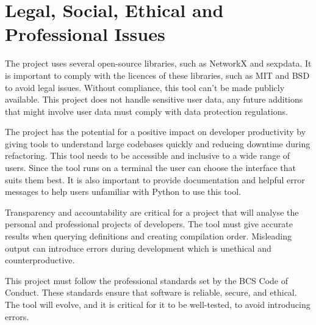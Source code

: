 
\chapter{Legal, Social, Ethical and Professional Issues}


The project uses several open-source libraries, such as NetworkX and sexpdata.
It is important to comply with the licences of these libraries, such as MIT and
BSD to avoid legal issues. Without compliance, this tool can't be made publicly
available. This project does not handle sensitive user data, any future
additions that might involve user data must comply with data protection
regulations.

The project has the potential for a positive impact on developer productivity by
giving tools to understand large codebases quickly and reducing downtime
during refactoring. This tool needs to be accessible and
inclusive to a wide range of users. Since the tool runs on a terminal the user
can choose the interface that suits them best. It is also important to provide
documentation and helpful error messages to help users unfamiliar with Python
to use this tool.

Transparency and accountability are critical for a project that will analyse
the personal and professional projects of developers. The tool must give
accurate results when querying definitions and creating compilation order.
Misleading output can introduce errors during development which is unethical
and counterproductive.

This project must follow the professional standards set by the BCS Code of Conduct.
These standards ensure that software is reliable, secure, and ethical. The tool
will evolve, and it is critical for it to be well-tested, to avoid
introducing errors.

%

